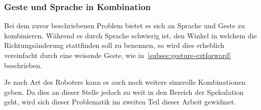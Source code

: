 \subsubsection{Geste und Sprache in Kombination}

Bei dem zuvor beschriebenen Problem bietet es sich an Sprache und Geste zu kombinieren. W\"ahrend es durch Sprache schwierig ist, den Winkel in 
welchem die Richtungs\"anderung stattfinden soll zu benennen, so wird dies erheblich vereinfacht durch eine weisende Geste, wie in~\ref{subsec:gesture-extforward} beschrieben.

Je nach Art des Roboters kann es auch noch weitere sinnvolle Kombinationen geben. Da dies an dieser Stelle jedoch zu weit in den Bereich der Spekulation geht,
wird sich dieser Problematik im zweiten Teil dieser Arbeit gewidmet.